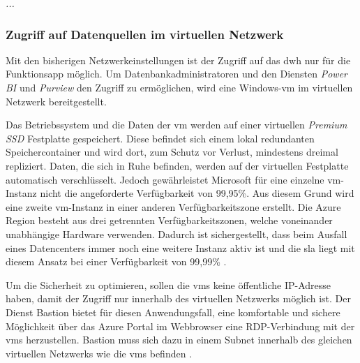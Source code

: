 


\textit{...}

\subsubsection{Zugriff auf Datenquellen im virtuellen Netzwerk} \label{subsec:infra:konfig:vm}
Mit den bisherigen Netzwerkeinstellungen ist der Zugriff auf das \ac{dwh} nur für die Funktionsapp möglich. Um Datenbankadministratoren und den Diensten \textit{Power BI} und \textit{Purview} den Zugriff zu ermöglichen, wird eine Windows-\ac{vm} im virtuellen Netzwerk bereitgestellt. 

Das Betriebssystem und die Daten der \ac{vm} werden auf einer virtuellen \textit{Premium SSD} Festplatte gespeichert. Diese befindet sich einem lokal redundanten Speichercontainer und wird dort, zum Schutz vor Verlust, mindestens dreimal repliziert. Daten, die sich in Ruhe befinden, werden auf der virtuellen Festplatte automatisch verschlüsselt. Jedoch gewährleistet Microsoft für eine einzelne \ac{vm}-Instanz nicht die angeforderte Verfügbarkeit von 99,95\%. Aus diesem Grund wird eine zweite \ac{vm}-Instanz in einer anderen Verfügbarkeitszone erstellt. Die Azure Region besteht aus drei getrennten Verfügbarkeitszonen, welche voneinander unabhängige Hardware verwenden. Dadurch ist sichergestellt, dass beim Ausfall eines Datencenters immer noch eine weitere Instanz aktiv ist und die \ac{sla} liegt mit diesem Ansatz bei einer Verfügbarkeit von 99,99\% \cite[vgl.][]{soh_data_2020}.

Um die Sicherheit zu optimieren, sollen die \acp{vm} keine öffentliche IP-Adresse haben, damit der Zugriff nur innerhalb des virtuellen Netzwerks möglich ist. Der Dienst Bastion bietet für diesen Anwendungsfall, eine komfortable und sichere Möglichkeit über das Azure Portal im Webbrowser eine RDP-Verbindung mit der \acp{vm} herzustellen. Bastion muss sich dazu in einem Subnet innerhalb des gleichen virtuellen Netzwerks wie die \acp{vm} befinden \cite[vgl.][]{herath_azure_2022}.

